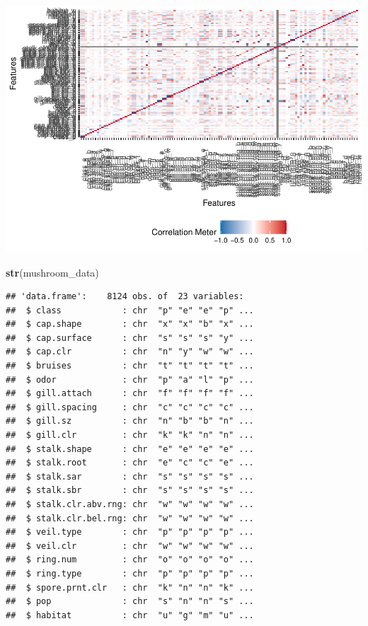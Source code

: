 \documentclass[
  english,
  man]{apa6}
\newenvironment{Shaded}{\begin{snugshade}}{\end{snugshade}}
\newcommand{\KeywordTok}[1]{\textcolor[rgb]{0.13,0.29,0.53}{\textbf{#1}}}
\newcommand{\NormalTok}[1]{#1}
\begin{document}
\includegraphics{Test_files/figure-latex/data exploration-3.pdf}

\begin{Shaded}
\begin{Highlighting}[]
\KeywordTok{str}\NormalTok{(mushroom_data)}
\end{Highlighting}
\end{Shaded}

\begin{verbatim}
## 'data.frame':    8124 obs. of  23 variables:
##  $ class            : chr  "p" "e" "e" "p" ...
##  $ cap.shape        : chr  "x" "x" "b" "x" ...
##  $ cap.surface      : chr  "s" "s" "s" "y" ...
##  $ cap.clr          : chr  "n" "y" "w" "w" ...
##  $ bruises          : chr  "t" "t" "t" "t" ...
##  $ odor             : chr  "p" "a" "l" "p" ...
##  $ gill.attach      : chr  "f" "f" "f" "f" ...
##  $ gill.spacing     : chr  "c" "c" "c" "c" ...
##  $ gill.sz          : chr  "n" "b" "b" "n" ...
##  $ gill.clr         : chr  "k" "k" "n" "n" ...
##  $ stalk.shape      : chr  "e" "e" "e" "e" ...
##  $ stalk.root       : chr  "e" "c" "c" "e" ...
##  $ stalk.sar        : chr  "s" "s" "s" "s" ...
##  $ stalk.sbr        : chr  "s" "s" "s" "s" ...
##  $ stalk.clr.abv.rng: chr  "w" "w" "w" "w" ...
##  $ stalk.clr.bel.rng: chr  "w" "w" "w" "w" ...
##  $ veil.type        : chr  "p" "p" "p" "p" ...
##  $ veil.clr         : chr  "w" "w" "w" "w" ...
##  $ ring.num         : chr  "o" "o" "o" "o" ...
##  $ ring.type        : chr  "p" "p" "p" "p" ...
##  $ spore.prnt.clr   : chr  "k" "n" "n" "k" ...
##  $ pop              : chr  "s" "n" "n" "s" ...
##  $ habitat          : chr  "u" "g" "m" "u" ...
\end{verbatim}
\end{document}
